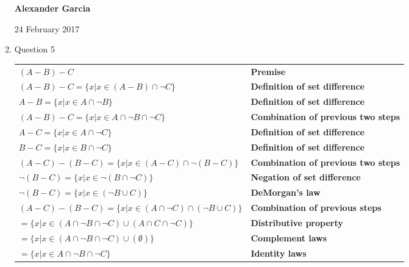 \documentclass[11pt]{article}
\begin{document}
\begin{enumerate}
		\textbf{Alexander Garcia}

		24 February 2017 \\

	\item Question 5

		\begin{tabular}[]{l l}
			$(A - B) - C$ & \textbf{Premise} \\

			$(A - B) - C = \{x | x \in (A-B) \cap \neg C\}$ &
			\textbf{Definition of set difference} \\

			$A-B = \{x | x \in A \cap \neg B\}$ & 
			\textbf{Definition of set difference} \\

			$(A - B) - C = \{x | x \in A \cap \neg B \cap \neg C\}$ & 
			\textbf{Combination of previous two steps} \\

			$A-C = \{x | x \in A \cap \neg C\}$ & 
			\textbf{Definition of set difference} \\

			$B-C = \{x | x \in B \cap \neg C\}$ & 
			\textbf{Definition of set difference} \\

			$(A-C) - (B-C) = \{x | x \in (A-C) \cap \neg (B-C)\}$ & 
			\textbf{Combination of previous two steps} \\

			$\neg {(B-C)} = \{x | x \in \neg (B \cap \neg C) \}$ &
			\textbf{Negation of set difference} \\

			$\neg (B-C) = \{x | x\in (\neg B \cup C) \}$ & 
			\textbf{DeMorgan's law} \\

			$(A-C)-(B-C) = \{x | x \in (A \cap \neg C) \cap (\neg B \cup C) \}$ &
			\textbf{Combination of previous steps} \\

			$=\{x | x \in (A \cap \neg B \cap \neg C) \cup (A \cap C \cap \neg C) \}$ &
			\textbf{Distributive property} \\

			$=\{x | x \in (A \cap \neg B \cap \neg C) \cup (\emptyset) \}$ &
			\textbf{Complement laws} \\

			$=\{x | x \in A \cap \neg B \cap \neg C \}$ &
			\textbf{Identity laws} \\

		\end{tabular}


\end{enumerate}
\end{document}
